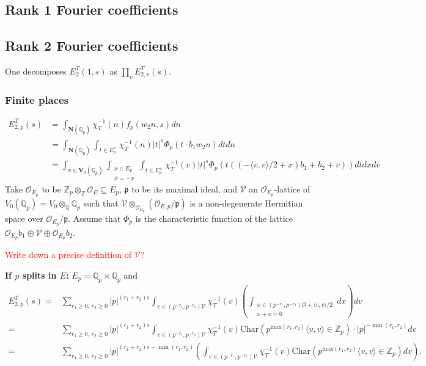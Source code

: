 \documentclass[12pt]{article}
\theoremstyle{remark}
\theoremstyle{definition}
\newcommand{\oo}{\mathcal{O}}
\newcommand{\Z}{\mathbb{Z}}
\newcommand{\Q}{\mathbb{Q}}
\newcommand{\lrangle}[2]{\langle #1,#2\rangle}
\newcommand{\rmm}[1]{\mathrm{#1}}
\newcommand{\bff}[1]{\mathbf{#1}}
\newcommand{\call}[1]{\mathcal{#1}}
\newcommand{\frakk}[1]{\mathfrak{#1}}
\begin{document}
\subsection{Rank 1 Fourier coefficients}
\label{section rank 1 Fourier coefficients}
\subsection{Rank 2 Fourier coefficients}
\label{section rank 2 Fourier coefficients}
One decomposes $E_{2}^{T}(1,s)$ as $\prod_{v}E_{2,v}^{T}(s)$.
\subsubsection{Finite places}
\label{section finite place rank 2 Fourier} 
\begin{align*}
    E_{2,p}^{T}(s)&=\int_{\bff{N}(\Q_{p})}\chi_{T}^{-1}(n)f_{p}(w_{2}n,s)dn\\
    &=\int_{\bff{N}(\Q_{p})}\int_{t\in E_{p}^{\times}}\chi_{T}^{-1}(n)|t|^{s}\Phi_{p}(t\cdot b_{1}w_{2}n)dtdn\\
    &=\int_{v\in \bff{V}_{0}(\Q_{p})}\int_{\substack{x\in E_{p}\\ \overline{x}=-x}}\int_{t\in E_{p}^{\times}}\chi_{T}^{-1}(v)|t|^{s}\Phi_{p}\left(t\left(\left(-\lrangle{v}{v}/2+x\right)b_{1}+b_{2}+v\right)\right)dtdxdv
\end{align*}
Take $\oo_{E_{p}}$ to be $\Z_{p}\otimes_{\Z}\oo_{E}\subseteq E_{p}$,
$\frakk{p}$ to be its maximal ideal,
and $\call{V}$ an $\oo_{E_{p}}$-lattice of $V_{0}(\Q_{p})=V_{0}\otimes_{\Q}\Q_{p}$ 
such that $\call{V}\otimes_{\oo_{E_{p}}}\left(\oo_{E,p}/\frakk{p}\right)$ is a non-degenerate Hermitian space over $\oo_{E_{p}}/\frakk{p}$.
Assume that $\Phi_{p}$ is the characteristic function of the lattice 
$\oo_{E_{p}}b_{1}\oplus \call{V}\oplus \oo_{E_{p}}b_{2}$.

\textcolor{red}{Write down a precise definition of $\call{V}$?}

\textbf{If $p$ splits in $E$:}
$E_{p}=\Q_{p}\times\Q_{p}$ and
\begin{align*}
    E_{2,p}^{T}(s)=&\sum_{r_{1}\geq 0,\,r_{2}\geq 0}|p|^{(r_{1}+r_{2})s}\int_{v\in (p^{-r_{1}},p^{-r_{2}})\call{V}}\chi_{T}^{-1}(v)\left(\int_{\substack{x\in (p^{-r_{1}},p^{-r_{2}})\oo+\lrangle{v}{v}/2\\ x+\overline{x}=0}}dx\right)dv\\
    =&\sum_{r_{1}\geq 0,\,r_{2}\geq 0}|p|^{(r_{1}+r_{2})s}\int_{v\in (p^{-r_{1}},p^{-r_{2}})\call{V}}\chi_{T}^{-1}(v)\rmm{Char}(p^{\rmm{max}(r_{1},r_{2})}\lrangle{v}{v}\in \Z_{p})\cdot |p|^{-\min(r_{1},r_{2})}dv\\
    =&\sum_{r_{1}\geq 0,\,r_{2}\geq 0}|p|^{(r_{1}+r_{2})s-\min(r_{1},r_{2})}\left(\int_{v\in (p^{-r_{1}},p^{-r_{2}})\call{V}}\chi_{T}^{-1}(v)\rmm{Char}(p^{\rmm{max}(r_{1},r_{2})}\lrangle{v}{v}\in \Z_{p})dv\right).
\end{align*}
\end{document}
